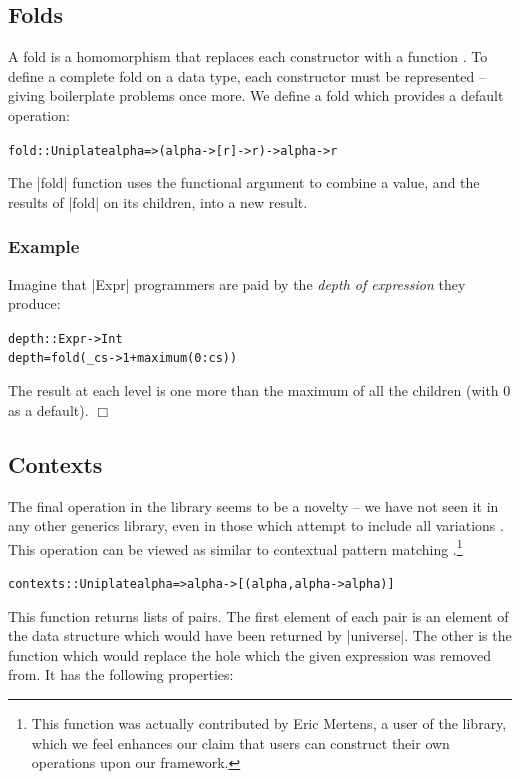 \documentclass[preprint]{sigplanconf}
\let\cite=\citep
\newcounter{exmp}
\newcommand{\yesexample}{\subsubsection*{Example \arabic{exmp}}\refstepcounter{exmp}}
\newcommand{\noexample}{\hfill$\Box$}
\newenvironment{code}{\begin{alltt}\small}{\end{alltt}}
\newenvironment{example}{\yesexample}{\noexample}
\begin{document}
\subsection{Folds}

A fold is a homomorphism that replaces each constructor with a function \cite{sheard:fold}. To define a complete fold on a data type, each constructor must be represented -- giving boilerplate problems once more. We define a fold which provides a default operation:

\begin{code}
fold :: Uniplate alpha => (alpha -> [r] -> r) -> alpha -> r
\end{code}

The |fold| function uses the functional argument to combine a value, and the results of |fold| on its children, into a new result.

\begin{example}
Imagine that |Expr| programmers are paid by the \textit{depth of expression} they produce:

\begin{code}
depth :: Expr -> Int
depth = fold (\_ cs -> 1 + maximum (0:cs))
\end{code}

The result at each level is one more than the maximum of all the children (with 0 as a default).
\end{example}

\subsection{Contexts}

The final operation in the library seems to be a novelty -- we have not seen it in any other generics library, even in those which attempt to include all variations \citep{ren:generic_recursion_toolbox}. This operation can be viewed as similar to contextual pattern matching \citep{mohnen:context_patterns}.\footnote{This function was actually contributed by Eric Mertens, a user of the library, which we feel enhances our claim that users can construct their own operations upon our framework.}

\begin{code}
contexts :: Uniplate alpha => alpha -> [(alpha, alpha -> alpha)]
\end{code}

This function returns lists of pairs. The first element of each pair is an element of the data structure which would have been returned by |universe|. The other is the function which would replace the hole which the given expression was removed from. It has the following properties:
\end{document}
